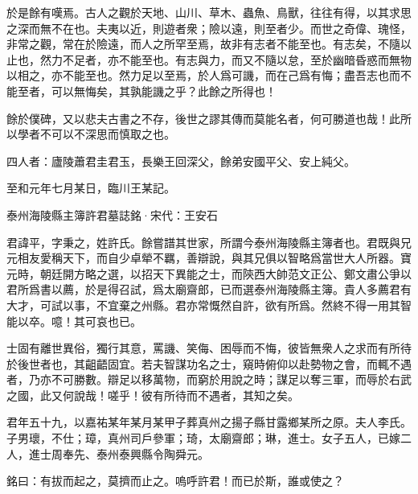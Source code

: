 \documentclass[12pt,a4paper]{ctexbook}
\begin{document}
於是餘有嘆焉。古人之觀於天地、山川、草木、蟲魚、鳥獸，往往有得，以其求思之深而無不在也。夫夷以近，則遊者衆；險以遠，則至者少。而世之奇偉、瑰怪，非常之觀，常在於險遠，而人之所罕至焉，故非有志者不能至也。有志矣，不隨以止也，然力不足者，亦不能至也。有志與力，而又不隨以怠，至於幽暗昏惑而無物以相之，亦不能至也。然力足以至焉，於人爲可譏，而在己爲有悔；盡吾志也而不能至者，可以無悔矣，其孰能譏之乎？此餘之所得也！\par
餘於僕碑，又以悲夫古書之不存，後世之謬其傳而莫能名者，何可勝道也哉！此所以學者不可以不深思而慎取之也。\par
四人者：廬陵蕭君圭君玉，長樂王回深父，餘弟安國平父、安上純父。\par
至和元年七月某日，臨川王某記。\par
泰州海陵縣主簿許君墓誌銘·宋代：王安石 \par
君諱平，字秉之，姓許氏。餘嘗譜其世家，所謂今泰州海陵縣主簿者也。君既與兄元相友愛稱天下，而自少卓犖不羈，善辯說，與其兄俱以智略爲當世大人所器。寶元時，朝廷開方略之選，以招天下異能之士，而陝西大帥范文正公、鄭文肅公爭以君所爲書以薦，於是得召試，爲太廟齋郎，已而選泰州海陵縣主簿。貴人多薦君有大才，可試以事，不宜棄之州縣。君亦常慨然自許，欲有所爲。然終不得一用其智能以卒。噫！其可哀也已。\par
士固有離世異俗，獨行其意，罵譏、笑侮、困辱而不悔，彼皆無衆人之求而有所待於後世者也，其齟齬固宜。若夫智謀功名之士，窺時俯仰以赴勢物之會，而輒不遇者，乃亦不可勝數。辯足以移萬物，而窮於用說之時；謀足以奪三軍，而辱於右武之國，此又何說哉！嗟乎！彼有所待而不遇者，其知之矣。\par
君年五十九，以嘉祐某年某月某甲子葬真州之揚子縣甘露鄉某所之原。夫人李氏。子男瓌，不仕；璋，真州司戶參軍；琦，太廟齋郎；琳，進士。女子五人，已嫁二人，進士周奉先、泰州泰興縣令陶舜元。\par
銘曰：有拔而起之，莫擠而止之。嗚呼許君！而已於斯，誰或使之？\par
\end{document}
